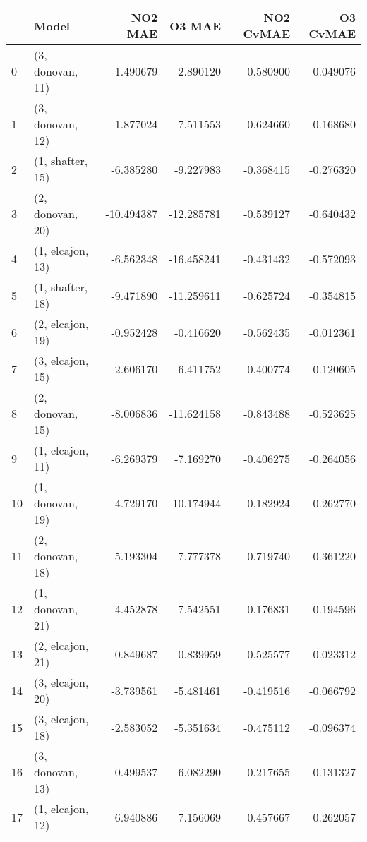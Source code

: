 \begin{tabular}{llrrrr}
\toprule
{} &             Model &    NO2 MAE &     O3 MAE &  NO2 CvMAE &  O3 CvMAE \\
\midrule
0  &  (3, donovan, 11) &  -1.490679 &  -2.890120 &  -0.580900 & -0.049076 \\
1  &  (3, donovan, 12) &  -1.877024 &  -7.511553 &  -0.624660 & -0.168680 \\
2  &  (1, shafter, 15) &  -6.385280 &  -9.227983 &  -0.368415 & -0.276320 \\
3  &  (2, donovan, 20) & -10.494387 & -12.285781 &  -0.539127 & -0.640432 \\
4  &  (1, elcajon, 13) &  -6.562348 & -16.458241 &  -0.431432 & -0.572093 \\
5  &  (1, shafter, 18) &  -9.471890 & -11.259611 &  -0.625724 & -0.354815 \\
6  &  (2, elcajon, 19) &  -0.952428 &  -0.416620 &  -0.562435 & -0.012361 \\
7  &  (3, elcajon, 15) &  -2.606170 &  -6.411752 &  -0.400774 & -0.120605 \\
8  &  (2, donovan, 15) &  -8.006836 & -11.624158 &  -0.843488 & -0.523625 \\
9  &  (1, elcajon, 11) &  -6.269379 &  -7.169270 &  -0.406275 & -0.264056 \\
10 &  (1, donovan, 19) &  -4.729170 & -10.174944 &  -0.182924 & -0.262770 \\
11 &  (2, donovan, 18) &  -5.193304 &  -7.777378 &  -0.719740 & -0.361220 \\
12 &  (1, donovan, 21) &  -4.452878 &  -7.542551 &  -0.176831 & -0.194596 \\
13 &  (2, elcajon, 21) &  -0.849687 &  -0.839959 &  -0.525577 & -0.023312 \\
14 &  (3, elcajon, 20) &  -3.739561 &  -5.481461 &  -0.419516 & -0.066792 \\
15 &  (3, elcajon, 18) &  -2.583052 &  -5.351634 &  -0.475112 & -0.096374 \\
16 &  (3, donovan, 13) &   0.499537 &  -6.082290 &  -0.217655 & -0.131327 \\
17 &  (1, elcajon, 12) &  -6.940886 &  -7.156069 &  -0.457667 & -0.262057 \\
\bottomrule
\end{tabular}
